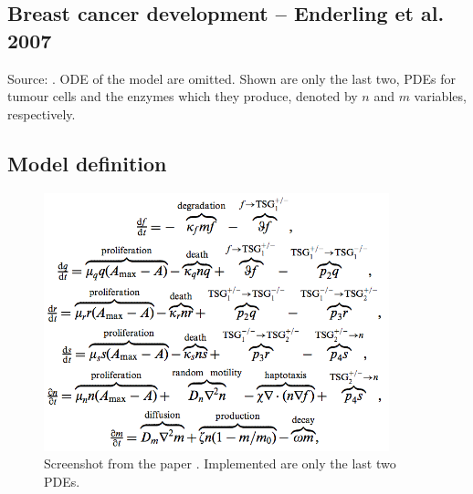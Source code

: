 \bigskip
\subsection{Breast cancer development -- Enderling et al. 2007}
\label{subsec:Enderling}
Source: \cite{Enderling:2007uq}.
 ODE of the model are omitted. Shown are only the last two, PDEs 
for tumour cells and the enzymes which they produce, denoted by $n$
and $m$ variables, respectively.

\subsection*{Model definition}
\begin{figure}[htb]
\centering
  \includegraphics[width=100mm]{pics/Enderling2007}
  \caption{Screenshot from the paper \cite{Enderling:2007uq}. Implemented are 
  only the last two PDEs.}
\end{figure}



